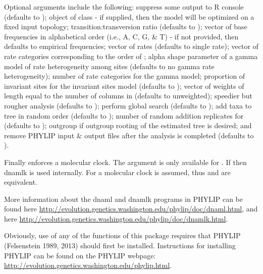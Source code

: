 \documentclass[a4paper]{book}
\begin{document}
%
\begin{Details}\relax
Optional arguments include the following:  suppress some output to R console (defaults to );  object of class  - if supplied, then the model will be optimized on a fixed input topology;  transition:transversion ratio (defaults to );  vector of base frequencies in alphabetical order (i.e., A, C, G, \& T) - if not provided, then defaults to empirical frequencies;  vector of rates (defaults to single rate);  vector of rate categories corresponding to the order of ;  alpha shape parameter of a gamma model of rate heterogeneity among sites (defaults to no gamma rate heterogeneity);  number of rate categories for the gamma model;  proportion of invariant sites for the invariant sites model (defaults to );  vector of weights of length equal to the number of columns in  (defaults to unweighted);  speedier but rougher analysis (defaults to );  perform global search (defaults to );  add taxa to tree in random order (defaults to );  number of random addition replicates for  (defaults to );  outgroup if outgroup rooting of the estimated tree is desired; and  remove PHYLIP input \& output files after the analysis is completed (defaults to ).

Finally  enforces a molecular clock. The argument  is only available for . If  then dnamlk is used internally. For  a molecular clock is assumed, thus  and  are equivalent.

More information about the dnaml and dnamlk programs in PHYLIP can be found here \url{http://evolution.genetics.washington.edu/phylip/doc/dnaml.html}, and here \url{http://evolution.genetics.washington.edu/phylip/doc/dnamlk.html}.

Obviously, use of any of the functions of this package requires that PHYLIP (Felsenstein 1989, 2013) should first be installed. Instructions for installing PHYLIP can be found on the PHYLIP webpage: \url{http://evolution.genetics.washington.edu/phylip.html}.
\end{Details}
\end{document}
